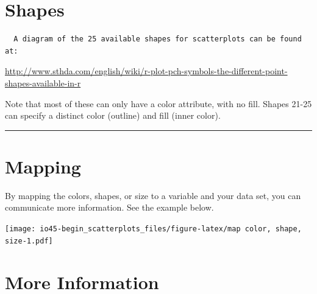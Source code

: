 \documentclass[
]{book}
\newenvironment{Shaded}{\begin{snugshade}}{\end{snugshade}}
\newcommand{\DataTypeTok}[1]{\textcolor[rgb]{0.13,0.29,0.53}{#1}}
\newcommand{\KeywordTok}[1]{\textcolor[rgb]{0.13,0.29,0.53}{\textbf{#1}}}
\newcommand{\NormalTok}[1]{#1}
\newcommand{\OperatorTok}[1]{\textcolor[rgb]{0.81,0.36,0.00}{\textbf{#1}}}
\newcommand{\StringTok}[1]{\textcolor[rgb]{0.31,0.60,0.02}{#1}}
\begin{document}
\hypertarget{shapes}{%
\chapter{Shapes}\label{shapes}}

\begin{verbatim}
  A diagram of the 25 available shapes for scatterplots can be found at:
\end{verbatim}

\url{http://www.sthda.com/english/wiki/r-plot-pch-symbols-the-different-point-shapes-available-in-r}

Note that most of these can only have a color attribute, with no fill. Shapes 21-25 can specify a distinct color (outline) and fill (inner color).

\begin{center}\rule{0.5\linewidth}{0.5pt}\end{center}

\hypertarget{mapping}{%
\chapter{Mapping}\label{mapping}}

By mapping the colors, shapes, or size to a variable and your data set, you can communicate more information. See the example below.

\begin{Shaded}
\end{Shaded}

\texttt{[image: io45-begin\_scatterplots\_files/figure-latex/map color, shape, size-1.pdf]}

\hypertarget{more-information}{%
\chapter{More Information}\label{more-information}}
\end{document}
